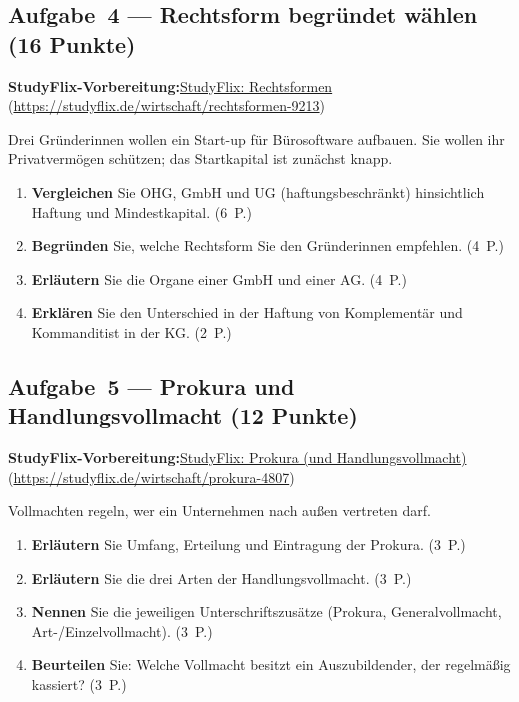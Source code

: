 \documentclass[11pt, a4paper]{article}
\begin{document}
\subsection*{Aufgabe~4 --- Rechtsform begründet wählen (16 Punkte)}

\noindent\textbf{\color{bfwAccent}StudyFlix-Vorbereitung:}\enspace \href{https://studyflix.de/wirtschaft/rechtsformen-9213}{StudyFlix: Rechtsformen} (\url{https://studyflix.de/wirtschaft/rechtsformen-9213})

\medskip
Drei Gründerinnen wollen ein Start-up für Bürosoftware aufbauen. Sie wollen ihr
Privatvermögen schützen; das Startkapital ist zunächst knapp.

\begin{enumerate}[label=(\alph*)]
  \item \textbf{Vergleichen} Sie OHG, GmbH und UG (haftungsbeschränkt) hinsichtlich Haftung und Mindestkapital. \hfill (6~P.)
  \item \textbf{Begründen} Sie, welche Rechtsform Sie den Gründerinnen empfehlen. \hfill (4~P.)
  \item \textbf{Erläutern} Sie die Organe einer GmbH und einer AG. \hfill (4~P.)
  \item \textbf{Erklären} Sie den Unterschied in der Haftung von Komplementär und Kommanditist in der KG. \hfill (2~P.)
\end{enumerate}

\subsection*{Aufgabe~5 --- Prokura und Handlungsvollmacht (12 Punkte)}

\noindent\textbf{\color{bfwAccent}StudyFlix-Vorbereitung:}\enspace \href{https://studyflix.de/wirtschaft/prokura-4807}{StudyFlix: Prokura (und Handlungsvollmacht)} (\url{https://studyflix.de/wirtschaft/prokura-4807})

\medskip
Vollmachten regeln, wer ein Unternehmen nach außen vertreten darf.

\begin{enumerate}[label=(\alph*)]
  \item \textbf{Erläutern} Sie Umfang, Erteilung und Eintragung der Prokura. \hfill (3~P.)
  \item \textbf{Erläutern} Sie die drei Arten der Handlungsvollmacht. \hfill (3~P.)
  \item \textbf{Nennen} Sie die jeweiligen Unterschriftszusätze (Prokura, Generalvollmacht, Art-/Einzelvollmacht). \hfill (3~P.)
  \item \textbf{Beurteilen} Sie: Welche Vollmacht besitzt ein Auszubildender, der regelmäßig kassiert? \hfill (3~P.)
\end{enumerate}
\end{document}
